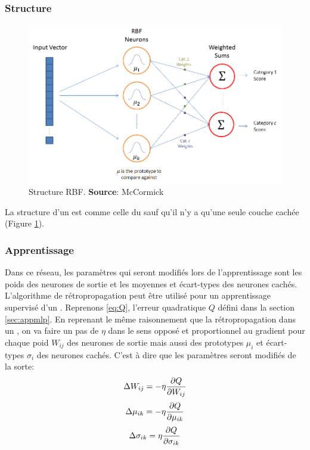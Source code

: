 \subsubsection{Structure}
\begin{figure}
 \centering
 \includegraphics[scale=0.5]{../figures/RBFstruct.png}
 \caption{Structure RBF. \textbf{Source}: McCormick\cite{RBFtuto}}
 \label{structurerbf}
\end{figure}
La structure d'un \rbf est comme celle du \mlp sauf qu'il n'y a qu'une seule couche cachée (Figure \ref{structurerbf}).
\subsubsection{Apprentissage}
Dans ce réseau, les paramètres qui seront modifiés lors de l'apprentissage sont les poids des neurones de sortie et les moyennes et écart-types des neurones cachés.
L'algorithme de rétropropagation peut être utilisé pour un apprentissage supervisé d'un \rbf.
Reprenons \eqref{eq:Q}, l'erreur quadratique $Q$ défini dans la section \ref{sec:appmlp}.
En reprenant le même raisonnement que la rétropropagation dans un \mlp,
on va faire un pas de $\eta$ dans le sens opposé et proportionnel au gradient pour chaque poid $W_{ij}$ des neurones de sortie mais aussi des prototypes $\mu_i$ et écart-types $\sigma_i$ des neurones cachés.
C'est à dire que les paramètres seront modifiés de la sorte:
\begin{equation}\label{eq:modifpoid}
 \Delta W_{ij} = -\eta \frac{\partial Q}{\partial W_{ij}}
\end{equation}
\begin{equation}\label{eq:modifmu}
 \Delta \mu_{ik} = -\eta \frac{\partial Q}{\partial \mu_{ik}}
\end{equation}
\begin{equation}\label{eq:modifsigma}
 \Delta \sigma_{ik} = \eta \frac{\partial Q}{\partial \sigma_{ik}}
\end{equation}

